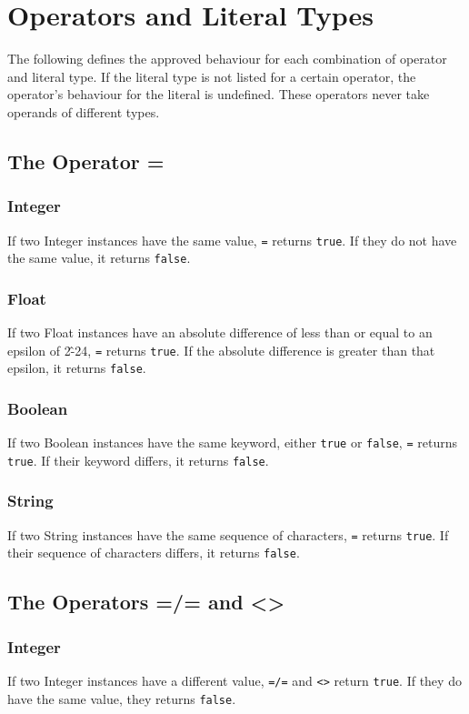 \section{Operators and Literal Types}
The following defines the approved behaviour for each combination of operator and literal type. If the literal type is not listed for a certain operator, the operator's behaviour for the literal is undefined. These operators never take operands of different types.
\subsection{The Operator =}
\subsubsection{Integer}
If two Integer instances have the same value, \verb!=! returns \verb!true!. If they do not have the same value, it returns \verb!false!.
\subsubsection{Float}
If two Float instances have an absolute difference of less than or equal to an epsilon of 2\^{-24}, \verb!=! returns \verb!true!. If the absolute difference is greater than that epsilon, it returns \verb!false!.
\subsubsection{Boolean}
If two Boolean instances have the same keyword, either \verb!true! or \verb!false!, \verb!=! returns \verb!true!. If their keyword differs, it returns \verb!false!.
\subsubsection{String}
If two String instances have the same sequence of characters, \verb!=! returns \verb!true!. If their sequence of characters differs, it returns \verb!false!.

\subsection{The Operators =/= and <>}
\subsubsection{Integer}
If two Integer instances have a different value, \verb!=/=! and \verb!<>! return \verb!true!. If they do have the same value, they returns \verb!false!.
